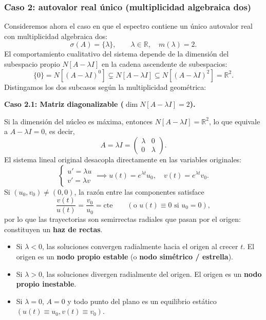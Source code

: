 \subsubsection{Caso 2: autovalor real único (multiplicidad algebraica dos)}

Consideremos ahora el caso en que el espectro contiene un único autovalor real con multiplicidad algebraica dos:
\[
    \sigma(A) = \{ \lambda \}, \qquad \lambda \in \mathbb{R}, \quad m(\lambda) = 2.
\]
El comportamiento cualitativo del sistema depende de la dimensión del subespacio propio $N[A - \lambda I]$ en la cadena ascendente de subespacios:
\[
    \{ 0 \} = N[(A - \lambda I)^0] \subsetneq N[A - \lambda I] \subseteq N[(A - \lambda I)^2] = \mathbb{R}^2.
\]
Distingamos los dos subcasos según la multiplicidad geométrica:

\textbf{Caso 2.1: Matriz diagonalizable ($\dim N[A - \lambda I] = 2$).}

Si la dimensión del núcleo es máxima, entonces $N[A - \lambda I] = \mathbb{R}^2$, lo que equivale a $A - \lambda I = 0$, es decir,
\[
    A = \lambda I = \begin{pmatrix} \lambda & 0 \\ 0 & \lambda \end{pmatrix}.
\]
El sistema lineal original desacopla directamente en las variables originales:
\[
    \begin{cases}
        u' = \lambda u \\
        v' = \lambda v
    \end{cases}
    \implies
    u(t) = e^{\lambda t} u_0, \quad v(t) = e^{\lambda t} v_0.
\]
Si $(u_0, v_0) \neq (0,0)$, la razón entre las componentes satisface
\[
    \frac{v(t)}{u(t)} = \frac{v_0}{u_0} = \text{cte} \qquad (\text{o } u(t) \equiv 0 \text{ si } u_0 = 0),
\]
por lo que las trayectorias son semirrectas radiales que pasan por el origen: constituyen un \textbf{haz de rectas}.
\begin{itemize}
    \item Si $\lambda < 0$, las soluciones convergen radialmente hacia el origen al crecer $t$. El origen es un \textbf{nodo propio estable} (o \textbf{nodo simétrico / estrella}).
    \item Si $\lambda > 0$, las soluciones divergen radialmente del origen. El origen es un \textbf{nodo propio inestable}.
    \item Si $\lambda = 0$, $A = 0$ y todo punto del plano es un equilibrio estático $(u(t) \equiv u_0, v(t) \equiv v_0)$.
\end{itemize}

